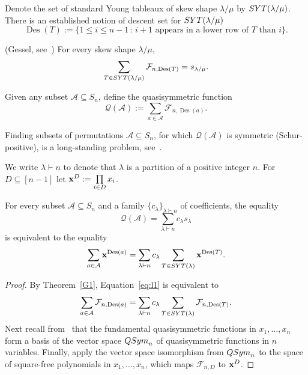 \documentclass[ALCO,published]{cedram}
\newcommand{\Q}{\mathcal Q}
\newcommand{\f}{\mathcal F}
\newcommand{\A}{\mathcal A}
\DeclareMathOperator\Des{Des}
\def\SYT{{\rm SYT}}
\begin{document}
Denote the set of standard Young tableaux of skew shape $\lambda/\mu$ by $\SYT(\lambda/\mu)$.
There is an established notion of descent set for $\SYT(\lambda/\mu)$
\begin{equation}\label{def:Des_SYT}
    \Des(T) := 
    \{1 \le i \le n-1 \,:\, i+1 \text{ appears in a lower row of }T\text{ than }i\}.
\end{equation}

\begin{theorem}{\rm (Gessel, see~\cite[Theorem 7.19.7]{EC2})}\label{G1} 
    For every skew shape $\lambda/\mu$,
    \[
        \sum\limits_{T\in \SYT(\lambda/\mu)}\f_{n,\Des(T)}=s_{\lambda/\mu}.
    \]
\end{theorem}	
		
Given any subset $\A\subseteq S_n$, define the quasisymmetric function
\[
    \Q(\A) := \sum_{a \in \A} \f_{n,\Des(a)}.
\]

Finding subsets of permutations $\A\subseteq S_n$, for which $\Q(\A)$ is symmetric (Schur-positive), is a  long-standing problem, see~\cite{GR}. 

We write $\lambda\vdash n$ to denote that $\lambda$ is a partition of a positive integer $n$.  
For $D\subseteq [n-1]$ let ${\bf x}^D:=\prod\limits_{i\in D}x_i$.

\begin{lemma}\label{lem:Schur-gf}
    For every subset $\A\subseteq S_n$ and a family $\{c_\lambda\}_{\lambda \vdash n}$
    of coefficients, the equality
    \begin{equation}\label{eq:l1}
        \Q(\A) =\sum_{\lambda\vdash n} c_{\lambda} s_{\lambda}
    \end{equation}
    is equivalent to the equality
    \begin{equation}\label{eq:l2}
        \sum\limits_{a\in \A} {\bf x}^{\Des(a)} = \sum_{\lambda\vdash n} c_{\lambda} 
        \sum_{T\in \SYT(\lambda)}{\bf x}^{\Des(T)}.
    \end{equation}
\end{lemma}

\begin{proof}
    By Theorem~\ref{G1}, 
    Equation~\eqref{eq:l1} is equivalent to
    \[
        \sum\limits_{a\in \A} \f_{n,\Des(a)}= \sum\limits_{\lambda\vdash n} c_{\lambda} \sum\limits_{T\in \SYT(\lambda)}\f_{n,\Des(T)}.
    \]
    Next recall from~\cite[Ch.~7]{EC2} that the fundamental quasisymmetric functions in $x_1,\dots,x_n$
    form a basis of the vector space ${\rm{QSym}}_n$ of quasisymmetric functions in $n$ variables.
    Finally, apply the vector space isomorphism from ${\rm{QSym}}_n$ 
    to the space of 
    square-free polynomials in $x_1,\ldots,x_n$, which maps 
    $\f_{n,D}$ to ${\bf x}^D$. 
\end{proof}
\end{document}
